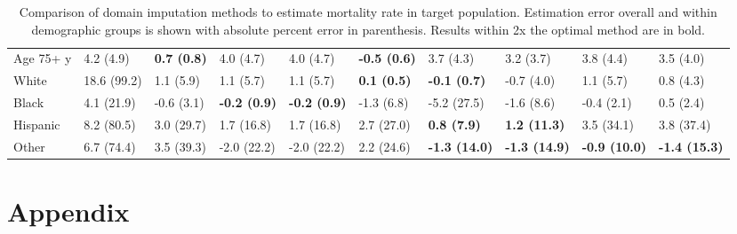 \documentclass{article} %
\begin{document}
\begin{landscape}
\begin{table}[]
\begin{tabular}{llllllllll}
     Age 75+ y &   4.2 (4.9) & \textbf{0.7 (0.8)} &           4.0 (4.7) &           4.0 (4.7) & \textbf{-0.5 (0.6)} &            3.7 (4.3) &            3.2 (3.7) &            3.8 (4.4) &            3.5 (4.0) \\
         White & 18.6 (99.2) &          1.1 (5.9) &           1.1 (5.7) &           1.1 (5.7) &  \textbf{0.1 (0.5)} &  \textbf{-0.1 (0.7)} &           -0.7 (4.0) &            1.1 (5.7) &            0.8 (4.3) \\
         Black &  4.1 (21.9) &         -0.6 (3.1) & \textbf{-0.2 (0.9)} & \textbf{-0.2 (0.9)} &          -1.3 (6.8) &          -5.2 (27.5) &           -1.6 (8.6) &           -0.4 (2.1) &            0.5 (2.4) \\
      Hispanic &  8.2 (80.5) &         3.0 (29.7) &          1.7 (16.8) &          1.7 (16.8) &          2.7 (27.0) &   \textbf{0.8 (7.9)} &  \textbf{1.2 (11.3)} &           3.5 (34.1) &           3.8 (37.4) \\
         Other &  6.7 (74.4) &         3.5 (39.3) &         -2.0 (22.2) &         -2.0 (22.2) &          2.2 (24.6) & \textbf{-1.3 (14.0)} & \textbf{-1.3 (14.9)} & \textbf{-0.9 (10.0)} & \textbf{-1.4 (15.3)} \\
\hline
\end{tabular}
    \caption{Comparison of domain imputation methods to estimate mortality rate in target population. Estimation error overall and within demographic groups is shown with absolute percent error in parenthesis. Results within 2x the optimal method are in bold.}
    \label{tab:results}
\end{table}
\end{landscape}






\section{Appendix}
\end{document}
